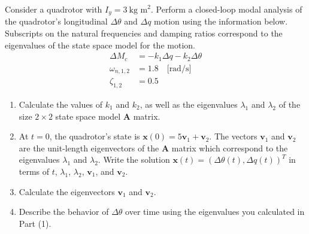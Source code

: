 \begin{question}

Consider a quadrotor with $I_y=3\ \text{kg m}^2$. Perform a closed-loop modal analysis of the quadrotor's longitudinal $\Delta \theta$ and $\Delta q$ motion using the information below. Subscripts on the natural frequencies and damping ratios correspond to the eigenvalues of the state space model for the motion.
\begin{align*}
    \Delta M_c &= -k_1 \Delta q - k_2 \Delta \theta \\
    \omega_{n,1,2} &= 1.8 \quad \text{[rad/s]} \\
    \zeta_{1,2} &= 0.5
\end{align*}

\begin{enumerate}
    \item Calculate the values of $k_1$ and $k_2$, as well as the eigenvalues $\lambda_1$ and $\lambda_2$ of the size $2\times2$ state space model $\mathbf{A}$ matrix.
    \item At $t=0$, the quadrotor's state is $\mathbf{x}(0) = 5\mathbf{v}_1 + \mathbf{v}_2$. The vectors $\mathbf{v}_1$ and $\mathbf{v}_2$ are the unit-length eigenvectors of the $\mathbf{A}$ matrix which correspond to the eigenvalues $\lambda_1$ and $\lambda_2$. Write the solution $\mathbf{x}(t)=(\Delta \theta(t),\Delta q(t))^T$ in terms of $t$, $\lambda_1$, $\lambda_2$, $\mathbf{v}_1$, and $\mathbf{v}_2$. 
    \item Calculate the eigenvectors $\mathbf{v}_1$ and $\mathbf{v}_2$.
    \item Describe the behavior of $\Delta \theta$ over time using the eigenvalues you calculated in Part (1).
\end{enumerate}
\end{question}